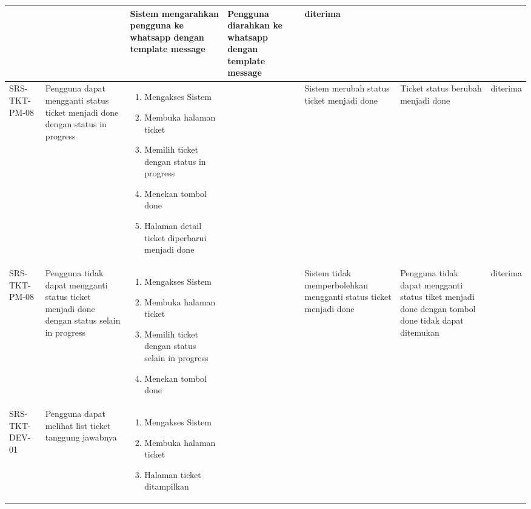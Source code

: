 \documentclass[12pt]{article}
\begin{document}
\begin{enumerate}[label=\textbf{5.\arabic*.}]
\begin{enumerate}[label=\textbf{5.2.\arabic*.}]
\begin{landscape}
\begin{longtable}{ |l|p{}|p{}|p{}|p{}|p{}|l| }
\begin{enumerate}[label=\arabic*.]
                \end{enumerate} 
                &  & Sistem mengarahkan pengguna ke whatsapp dengan template message
                & Pengguna diarahkan ke whatsapp dengan template message & diterima \\
                \hline
                SRS-TKT-PM-08 & Pengguna dapat mengganti status ticket menjadi done dengan status in progress & 
                \begin{enumerate}[label=\arabic*.] 
                    \item Mengakses Sistem
                    \item Membuka halaman ticket
                    \item Memilih ticket dengan status in progress
                    \item Menekan tombol done
                    \item Halaman detail ticket diperbarui menjadi done
                \end{enumerate} 
                &  & Sistem merubah status ticket menjadi done
                & Ticket status berubah menjadi done & diterima \\
                \hline
                SRS-TKT-PM-08 & Pengguna tidak dapat mengganti status ticket
                menjadi done dengan status selain in progress & 
                \begin{enumerate}[label=\arabic*.] 
                    \item Mengakses Sistem
                    \item Membuka halaman ticket
                    \item Memilih ticket dengan status selain in progress
                    \item Menekan tombol done
                \end{enumerate} 
                &  & Sistem tidak memperbolehkan mengganti status ticket menjadi done 
                & Pengguna tidak dapat mengganti status tiket menjadi done dengan tombol done tidak dapat ditemukan & diterima \\
                \hline
                SRS-TKT-DEV-01 & Pengguna dapat melihat list ticket tanggung jawabnya & 
                \begin{enumerate}[label=\arabic*.] 
                    \item Mengakses Sistem
                    \item Membuka halaman ticket
                    \item Halaman ticket ditampilkan

\end{enumerate}
\end{longtable}
\end{landscape}
\end{enumerate}
\end{enumerate}
\end{document}
